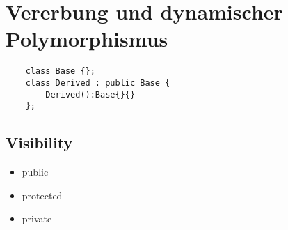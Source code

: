 \section{Vererbung und dynamischer Polymorphismus}
\begin{lstlisting}
	class Base {};
	class Derived : public Base {
		Derived():Base{}{}
	};
\end{lstlisting}

\subsection{Visibility}
\begin{itemize}
	\item public
	\item protected
	\item private
\end{itemize}

